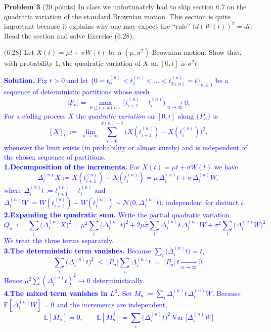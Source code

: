 \documentclass{article}
\begin{document}
\textbf{Problem 3}   (20 points) In class we unfortunately had to skip section 6.7 on the quadratic variation of the standard Brownian motion. This section is quite important because it explains why one may expect the “rule” 
$(d(W(t))^2 = dt.$
Read the section and solve Exercise (6.28).

(6.28) Let $X(t) = \mu t + \sigma W(t)$ be a $(\mu, \sigma^2)$-Brownian motion. Show that, with probability 1, the quadratic variation of $X$ on $[0, t]$ is $\sigma^2 t$.

\textcolor{blue}{
\textbf{Solution.}
Fix $t>0$ and let $\bigl\{0=t_0^{(n)}<t_1^{(n)}<\dots<t_{k(n)}^{(n)}=t\bigr\}_{n\ge1}$ be a sequence of deterministic partitions whose mesh
$$
|P_n|=\max_{0\le i<k(n)}\bigl(t_{i+1}^{(n)}-t_i^{(n)}\bigr)\xrightarrow[n\to\infty]{}0.
$$
For a càdlàg process $X$ the \emph{quadratic variation} on $[0,t]$ along $\{P_n\}$ is
$$
[X]_t\;:=\;\lim_{n\to\infty}\sum_{i=0}^{k(n)-1}\bigl(X(t_{i+1}^{(n)})-X(t_i^{(n)})\bigr)^2,
$$
whenever the limit exists (in probability or almost surely) and is independent of the chosen sequence of partitions. \\
\medskip
\textbf{1.\;Decomposition of the increments.}
For $X(t)=\mu t+\sigma W(t)$ we have
$$
\Delta_i^{(n)}X:=X(t_{i+1}^{(n)})-X(t_i^{(n)})=\mu\,\Delta_i^{(n)}t+\sigma\,\Delta_i^{(n)}W,
$$
where $\Delta_i^{(n)}t:=t_{i+1}^{(n)}-t_i^{(n)}$ and $\Delta_i^{(n)}W:=W(t_{i+1}^{(n)})-W(t_i^{(n)})\sim\mathcal N\bigl(0,\Delta_i^{(n)}t\bigr)$, independent for distinct $i$. \\
\medskip
\textbf{2.\;Expanding the quadratic sum.}
Write the partial quadratic variation
$$
Q_n\;:=\;\sum_{i}\bigl(\Delta_i^{(n)}X\bigr)^2
       =\mu^{2}\sum_{i}\bigl(\Delta_i^{(n)}t\bigr)^2
        +2\mu\sigma\sum_{i}\Delta_i^{(n)}t\,\Delta_i^{(n)}W
        +\sigma^{2}\sum_{i}\bigl(\Delta_i^{(n)}W\bigr)^2.
$$
We treat the three terms separately. \\
\medskip
\textbf{3.\;The deterministic term vanishes.}
Because $\sum_{i}\bigl(\Delta_i^{(n)}t\bigr)=t$,
$$
\sum_{i}\bigl(\Delta_i^{(n)}t\bigr)^2\;\le\;|P_n|\sum_{i}\Delta_i^{(n)}t
           \;=\;|P_n|\,t\xrightarrow[n\to\infty]{}0.
$$
Hence $\mu^{2}\sum(\Delta_i^{(n)}t)^2\to0$ deterministically. \\
\medskip
\textbf{4.\;The mixed term vanishes in $L^{2}$.}
Set $M_n:=\sum_{i}\Delta_i^{(n)}t\,\Delta_i^{(n)}W$. 
Because $\mathbb E[\Delta_i^{(n)}W]=0$ and the increments are independent,
$$
\mathbb E[M_n]=0,\qquad
\mathbb E[M_n^{2}]=\sum_{i}\bigl(\Delta_i^{(n)}t\bigr)^{2}\operatorname{Var}\!\bigl[\Delta_i^{(n)}W\bigr]
$$}
\end{document}
